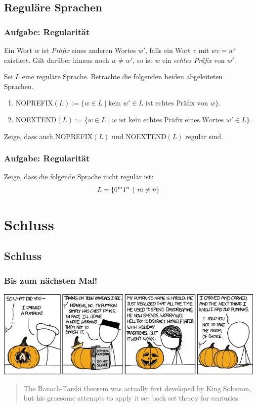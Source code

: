 \subsection{Reguläre Sprachen}

\begin{frame}
\frametitle{Aufgabe: Regularität}
Ein Wort $w$ ist \emph{Präfix} eines anderen Wortes
$w'$, falls ein Wort $v$ mit $wv = w'$ existiert. Gilt darüber hinaus
noch $w\neq w'$, so ist $w$ ein \emph{echtes Präfix} von $w'$.

Sei $L$ eine reguläre Sprache. Betrachte die folgenden beiden abgeleiteten
Sprachen.
\begin{enumerate}
\item NOPREFIX$(L):=\{w\in L\mid\mbox{kein $w'\in L$ ist echtes Präfix
    von $w$}\}.$
\item NOEXTEND$(L):= \{w\in L\mid \mbox{$w$ ist kein echtes Präfix eines
    Wortes $w'\in L$}\}.$
\end{enumerate} 
Zeige, dass auch NOPREFIX$(L)$ und NOEXTEND$(L)$
regulär sind.
\end{frame}
\begin{frame}
 \frametitle{Aufgabe: Regularität}
 Zeige, dass die folgende Sprache nicht regulär ist:
 $$L = \left\lbrace 0^m 1^n \,\mid\, m \neq n \right\rbrace$$
\end{frame}

\section{Schluss}
\subsection{Schluss}

\begin{frame}
 \frametitle{Bis zum nächsten Mal!}
 \begin{center} \includegraphics[width=\textwidth]{images/xkcd_804.png} \end{center}
 \begin{quote}\scriptsize{The Banach-Tarski theorem was actually first developed by King Solomon, but his gruesome attempts to apply it set back set theory for centuries.}\end{quote}
\end{frame}


